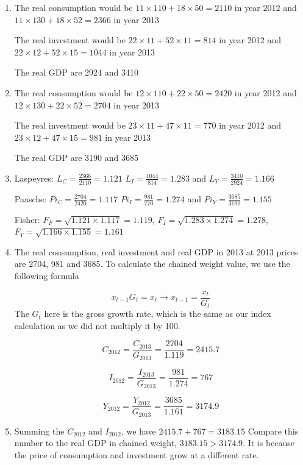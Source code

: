 \documentclass[addpoints,ngerman,12pt,answers]{exam}
\begin{document}
	\clearpage
	\begin{solution}
		\begin{enumerate}[label=(\alph*)]
			\item The real consumption would be $11\times110+18\times50 = 2110$ in year 2012 and $11\times130+18\times52=2366$ in year 2013
			
			The real investment would be $22\times 11 + 52\times 11 = 814$ in year 2012 and $22\times 12 + 52\times 15 = 1044$ in year 2013
			
			The real GDP are 2924 and 3410
			\item The real consumption would be $12\times110+22\times50 = 2420$ in year 2012 and $12\times130+22\times52=2704$ in year 2013
			
			The real investment would be $23\times 11 + 47\times 11 = 770$ in year 2012 and $23\times 12 + 47\times 15 = 981$ in year 2013
			
			The real GDP are 3190 and 3685
			
			\item Laspeyres: $L_C=\frac{2366}{2110}=1.121$ $L_I=\frac{1044}{814}=1.283$ and $L_Y=\frac{3410}{2924}=1.166$
			
			Paasche: $Pi_C=\frac{2704}{2420}=1.117$ $Pi_I=\frac{981}{770}=1.274$ and $Pi_Y=\frac{3685}{3190}=1.155$
			
			Fisher: $F_F = \sqrt{1.121\times 1.117}=1.119$, $F_I = \sqrt{1.283\times 1.274}=1.278$, $F_Y=\sqrt{1.166\times 1.155}=1.161$
			
			\item The real consumption, real investment and real GDP in 2013 at 2013 prices are 2704, 981 and 3685. To calculate the chained weight value, we use the following formula
			
			\[x_{t-1}G_t = x_t \to x_{t-1} = \frac{x_t}{G_t}\]
			The $G_t$ here is the gross growth rate, which is the same as our index calculation as we did not multiply it by 100.
			
			\[C_{2012} = \frac{C_{2013}}{G_{2013}} = \frac{2704}{1.119} = 2415.7\]
			
			\[I_{2012} = \frac{I_{2013}}{G_{2013}} = \frac{981}{1.274} = 767\]
			
			\[Y_{2012} = \frac{Y_{2012}}{G_{2013}} = \frac{3685}{1.161} = 3174.9\]
			\item Summing the $C_{2012}$ and $I_{2012}$, we have $2415.7+767 = 3183.15$
			Compare this number to the real GDP in chained weight, $3183.15>3174.9$. It is because the price of consumption and investment grow at a different rate.
			\end{enumerate}
	\end{solution}		
	
\end{document}
